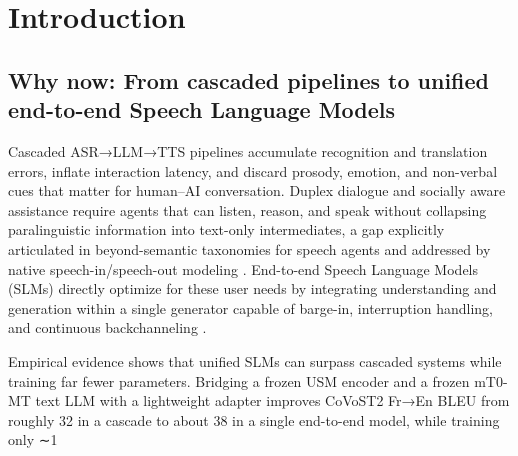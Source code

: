 \section{Introduction} \label{sec:Introduction}


\subsection{Why now: From cascaded pipelines to unified end-to-end Speech Language Models} \label{subsec:Why now: From cascaded pipelines to unified end-to-end Speech Language Models}

Cascaded ASR→LLM→TTS pipelines accumulate recognition and translation errors, inflate interaction latency, and discard prosody, emotion, and non-verbal cues that matter for human–AI conversation. Duplex dialogue and socially aware assistance require agents that can listen, reason, and speak without collapsing paralinguistic information into text-only intermediates, a gap explicitly articulated in beyond-semantic taxonomies for speech agents and addressed by native speech-in/speech-out modeling . End-to-end Speech Language Models (SLMs) directly optimize for these user needs by integrating understanding and generation within a single generator capable of barge-in, interruption handling, and continuous backchanneling \cite{ma2024languagemodelcanlistenwhilespeaking}.



Empirical evidence shows that unified SLMs can surpass cascaded systems while training far fewer parameters. Bridging a frozen USM encoder and a frozen mT0-MT text LLM with a lightweight adapter improves CoVoST2 Fr→En BLEU from roughly 32 in a cascade to about 38 in a single end-to-end model, while training only ∼1%



